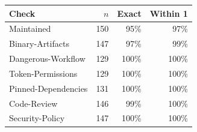 \begin{tabular}{lrrr}
\toprule
Check & $n$ & Exact & Within 1 \\
\midrule
Maintained & 150 & 95\% & 97\% \\
Binary-Artifacts & 147 & 97\% & 99\% \\
Dangerous-Workflow & 129 & 100\% & 100\% \\
Token-Permissions & 129 & 100\% & 100\% \\
Pinned-Dependencies & 131 & 100\% & 100\% \\
Code-Review & 146 & 99\% & 100\% \\
Security-Policy & 147 & 100\% & 100\% \\
\bottomrule
\end{tabular}
